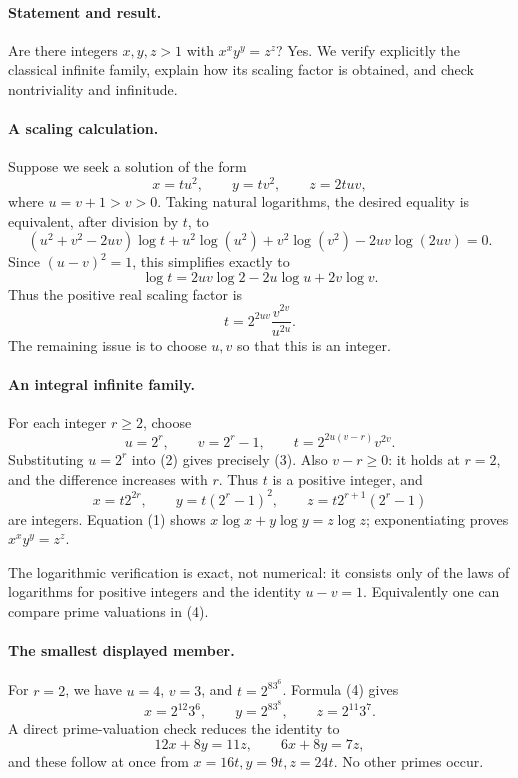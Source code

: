 \paragraph{Statement and result.}
Are there integers \(x,y,z>1\) with \(x^xy^y=z^z\)? Yes. We verify explicitly the classical infinite family, explain how its scaling factor is obtained, and check nontriviality and infinitude.

\paragraph{A scaling calculation.}
Suppose we seek a solution of the form
\[
 x=t u^2,\qquad y=t v^2,\qquad z=2tuv,
\]
where \(u=v+1>v>0\). Taking natural logarithms, the desired equality is equivalent, after division by \(t\), to
\[
 (u^2+v^2-2uv)\log t
 +u^2\log(u^2)+v^2\log(v^2)-2uv\log(2uv)=0.
\]
Since \((u-v)^2=1\), this simplifies exactly to
\[
 \log t=2uv\log2-2u\log u+2v\log v. \tag{1}
\]
Thus the positive real scaling factor is
\[
 t=2^{2uv}\frac{v^{2v}}{u^{2u}}. \tag{2}
\]
The remaining issue is to choose \(u,v\) so that this is an integer.

\paragraph{An integral infinite family.}
For each integer \(r\geq2\), choose
\[
 u=2^r,\qquad v=2^r-1,\qquad
 t=2^{2u(v-r)}v^{2v}. \tag{3}
\]
Substituting \(u=2^r\) into (2) gives precisely (3). Also \(v-r\geq0\): it holds at \(r=2\), and the difference increases with \(r\). Thus \(t\) is a positive integer, and
\[
 \boxed{\quad x=t2^{2r},\qquad y=t(2^r-1)^2,
 \qquad z=t2^{r+1}(2^r-1)\quad} \tag{4}
\]
are integers. Equation (1) shows \(x\log x+y\log y=z\log z\); exponentiating proves \(x^xy^y=z^z\).

The logarithmic verification is exact, not numerical: it consists only of the laws of logarithms for positive integers and the identity \(u-v=1\). Equivalently one can compare prime valuations in (4).

\paragraph{The smallest displayed member.}
For \(r=2\), we have \(u=4\), \(v=3\), and \(t=2^83^6\). Formula (4) gives
\[
 x=2^{12}3^6,\qquad y=2^83^8,\qquad z=2^{11}3^7.
\]
A direct prime-valuation check reduces the identity to
\[
 12x+8y=11z,\qquad 6x+8y=7z,
\]
and these follow at once from \(x=16t,y=9t,z=24t\). No other primes occur.

